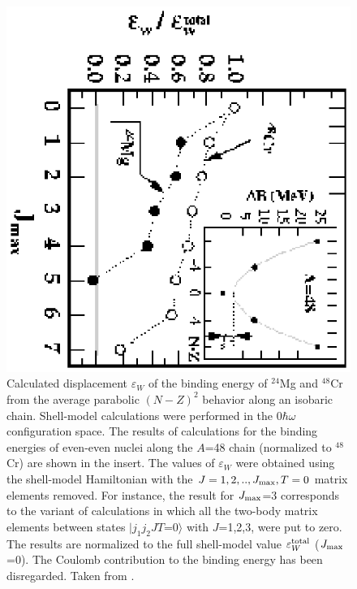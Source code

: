 \documentclass[rmp,aps,floatfix]{revtex4}
\begin{document}
\begin{figure}
\includegraphics[scale=0.45,angle=90,clip]{dean_hjorthjensen_fig19.ps}
\caption{Calculated displacement $\varepsilon_W$ of the binding energy of 
$^{24}$Mg and $^{48}$Cr
from the average parabolic $(N-Z)^2$
behavior along an isobaric chain.
 Shell-model calculations were performed in the 
$0\hbar\omega$ configuration  space.
The results of 
calculations for the binding energies
of even-even nuclei
along  the $A$=48 chain (normalized to  $^{48}$Cr)
are shown in the insert.
The values of  $\varepsilon_W$ 
were obtained using the shell-model Hamiltonian
with
the $J=1,2,..,J_{\rm max}, T=0$ matrix elements removed.
For instance, the result for $J_{\rm  max}$=3
corresponds to the variant of calculations in which
all the two-body  matrix elements between states
$|j_1j_2 JT$=$0\rangle$ with $J$=1,2,3, were put to zero.   
The results are normalized to  
the full shell-model value 
$\varepsilon_W^{\rm total}$ ($J_{\rm  max}$=0). 
The Coulomb contribution to the binding energy has been 
disregarded. Taken from  \protect\cite{Sat97}.
\label{satula_pn}}
\end{figure}
\end{document}
